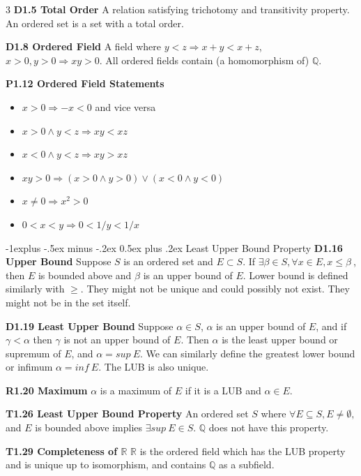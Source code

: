 \documentclass[10pt, landscape]{article}
\makeatletter
\renewcommand{\section}{\@startsection{section}{1}{0mm}%
                                {-1ex plus -.5ex minus -.2ex}%
                                {0.5ex plus .2ex}%
                                {\normalfont\large\bfseries}}
\renewcommand{\section}{\@startsection{section}{2}{0mm}%
                                {-1explus -.5ex minus -.2ex}%
                                {0.5ex plus .2ex}%
                                {\normalfont\normalsize\bfseries}}
\makeatother
\begin{document}
\begin{multicols*}{3}
\textbf{D1.5 Total Order} A relation satisfying trichotomy and transitivity property. An ordered set is a set with a total order.

\textbf{D1.8 Ordered Field} A field where $y < z \Rightarrow x+y<x+z$, $x>0, y>0 \Rightarrow xy > 0$. All ordered fields contain (a homomorphism of) $\mathbb{Q}$.

\textbf{P1.12 Ordered Field Statements}
\begin{itemize}
    \item $x>0 \Rightarrow -x < 0$ and vice versa
    \item $x > 0 \land y < z \Rightarrow xy<xz$
    \item $x<0 \land y<z \Rightarrow xy > xz$
    \item $xy>0 \Rightarrow (x > 0 \land y>0) \lor (x<0 \land y<0)$
    \item $x \neq 0 \Rightarrow x^2>0$
    \item $0<x<y \Rightarrow 0< 1/y < 1/x$
\end{itemize}

\section{Least Upper Bound Property}
\textbf{D1.16 Upper Bound} Suppose $S$ is an ordered set and $E \subset S$. If $\exists \beta \in S, \forall x \in E, x \leq \beta \ $, then $E$ is bounded above and $\beta$ is an upper bound of $E$. Lower bound is defined similarly with $\geq$. They might not be unique and could possibly not exist. They might not be in the set itself.

\textbf{D1.19 Least Upper Bound} Suppose $\alpha \in S$, $\alpha$ is an upper bound of $E$, and if $\gamma < \alpha$ then $\gamma$ is not an upper bound of $E$. Then $\alpha$ is the least upper bound or supremum of $E$, and $\alpha = sup\ E$. We can similarly define the greatest lower bound or infimum $\alpha = inf \ E$. The LUB is also unique.

\textbf{R1.20 Maximum} $\alpha$ is a maximum of $E$ if it is a LUB and $\alpha \in E$.

\textbf{T1.26 Least Upper Bound Property} An ordered set $S$ where $\forall E \subseteq S, E \neq \emptyset,$ and $E$ is bounded above implies $\exists sup\ E \in S$. $\mathbb{Q}$ does not have this property.

\textbf{T1.29 Completeness of $\mathbb{R}$} $\mathbb{R}$ is the ordered field which has the LUB property and is unique up to isomorphism, and contains $\mathbb{Q}$ as a subfield.


\end{multicols*}
\end{document}
